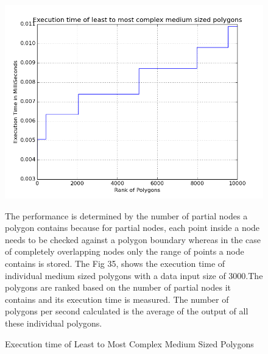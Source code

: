 \documentclass{article}
\begin{document}
\begin{figure}[ht]
\caption{Execution time of Least to Most Complex Medium Sized Polygons}
\includegraphics[scale=0.5]{LToMCmplxMedP}

The performance is determined by the number of partial nodes a polygon contains because for partial nodes, each point inside a node needs to be checked against a polygon boundary whereas in the case of completely overlapping nodes only the range of points a node contains is stored.
The Fig 35, shows the execution time of individual medium sized polygons with a data input size of 3000.The polygons are ranked based on the number of partial nodes it contains and its execution time is measured.
The number of polygons per second calculated is the average of the output of all these individual polygons.

\end{figure}
\end{document}
